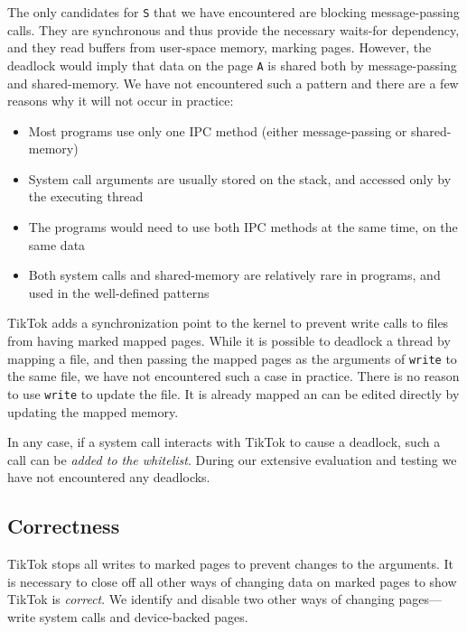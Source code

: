 \documentclass[conference]{IEEEtran}
\newcommand{\sysname}{TikTok}
\begin{document}
The only candidates for \texttt{S} that we have encountered are blocking
message-passing calls. They are synchronous and thus provide the necessary
waits-for dependency, and they read buffers from user-space memory, marking
pages. However, the deadlock would imply that data on the page \texttt{A} is
shared both by message-passing and shared-memory. We have not encountered such a
pattern and there are a few reasons why it will not occur in practice:

\begin{itemize}
  \item Most programs use only one IPC method (either message-passing or
  shared-memory)
  \item System call arguments are usually stored on the stack, and accessed only
  by the executing thread
  \item The programs would need to use both IPC methods at the same time, on the
  same data
  \item Both system calls and shared-memory are relatively rare in programs, and
  used in the well-defined patterns
\end{itemize}

\sysname{} adds a synchronization point to the kernel to prevent write calls to
files from having marked mapped pages. While it is possible to deadlock a thread
by mapping a file, and then passing the mapped pages as the arguments of
\texttt{write} to the same file, we have not encountered such a case in
practice. There is no reason to use \texttt{write} to update the file. It is
already mapped an can be edited directly by updating the mapped memory.

In any case, if a system call interacts with \sysname{} to cause a deadlock,
such a call can be \emph{added to the whitelist}. During our extensive
evaluation and testing we have not encountered any deadlocks.


\subsection{Correctness} \label{subsec:correctness}

\sysname{} stops all writes to marked pages to prevent changes to the arguments.
It is necessary to close off all other ways of changing data on marked pages to
show \sysname{} is \emph{correct}. We identify and disable two other ways of
changing pages---write system calls and device-backed pages.
\end{document}
